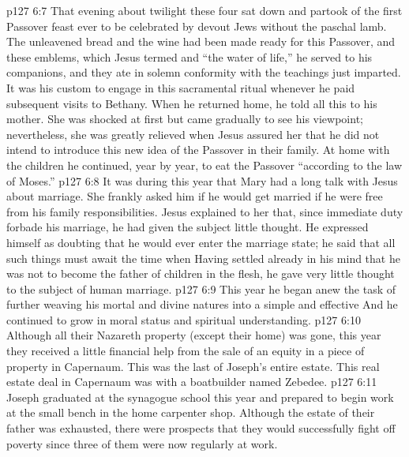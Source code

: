 \vs p127 6:7 That evening about twilight these four sat down and partook of the first Passover feast ever to be celebrated by devout Jews without the paschal lamb. The unleavened bread and the wine had been made ready for this Passover, and these emblems, which Jesus termed  and “the water of life,” he served to his companions, and they ate in solemn conformity with the teachings just imparted. It was his custom to engage in this sacramental ritual whenever he paid subsequent visits to Bethany. When he returned home, he told all this to his mother. She was shocked at first but came gradually to see his viewpoint; nevertheless, she was greatly relieved when Jesus assured her that he did not intend to introduce this new idea of the Passover in their family. At home with the children he continued, year by year, to eat the Passover “according to the law of Moses.”
\vs p127 6:8 \pc It was during this year that Mary had a long talk with Jesus about marriage. She frankly asked him if he would get married if he were free from his family responsibilities. Jesus explained to her that, since immediate duty forbade his marriage, he had given the subject little thought. He expressed himself as doubting that he would ever enter the marriage state; he said that all such things must await  the time when  Having settled already in his mind that he was not to become the father of children in the flesh, he gave very little thought to the subject of human marriage.
\vs p127 6:9 This year he began anew the task of further weaving his mortal and divine natures into a simple and effective  And he continued to grow in moral status and spiritual understanding.
\vs p127 6:10 Although all their Nazareth property (except their home) was gone, this year they received a little financial help from the sale of an equity in a piece of property in Capernaum. This was the last of Joseph’s entire estate. This real estate deal in Capernaum was with a boatbuilder named Zebedee.
\vs p127 6:11 Joseph graduated at the synagogue school this year and prepared to begin work at the small bench in the home carpenter shop. Although the estate of their father was exhausted, there were prospects that they would successfully fight off poverty since three of them were now regularly at work.
